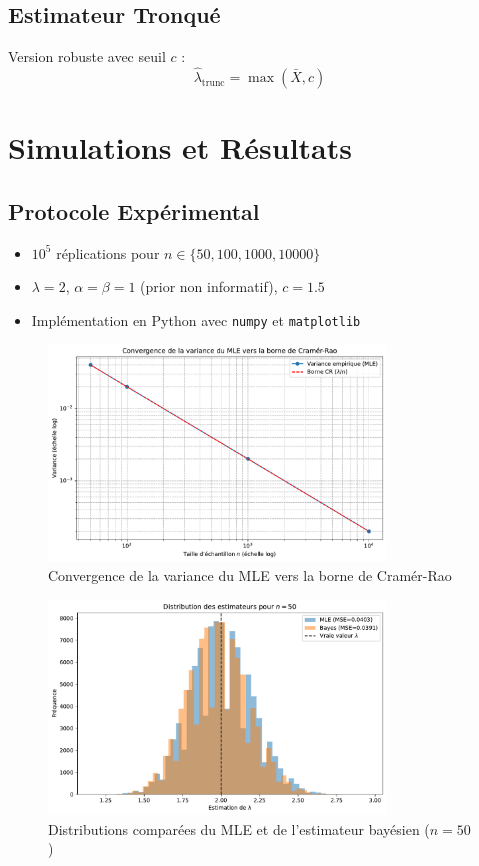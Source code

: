 \documentclass[12pt]{article}
\begin{document}
	\subsection{Estimateur Tronqué}
	Version robuste avec seuil $c$ :
	\[ \hat{\lambda}_{\text{trunc}} = \max(\bar{X}, c) \]
	
	\section{Simulations et Résultats}
	\subsection{Protocole Expérimental}
	\begin{itemize}
		\item $10^5$ réplications pour $n \in \{50,100,1000,10000\}$
		\item $\lambda = 2$, $\alpha = \beta = 1$ (prior non informatif), $c = 1.5$
		\item Implémentation en Python avec \texttt{numpy} et \texttt{matplotlib}
	\end{itemize}
	
	\begin{figure}[h!]
		\centering
		\includegraphics[width=0.8\textwidth]{figure/convergence_mle.pdf}
		\caption{Convergence de la variance du MLE vers la borne de Cramér-Rao}
		\label{fig:mle}
	\end{figure}
	
	\begin{figure}[h!]
		\centering
		\includegraphics[width=0.8\textwidth]{figure/mse_comparison.pdf}
		\caption{Distributions comparées du MLE et de l'estimateur bayésien ($n=50$)}
		\label{fig:bayes}
	\end{figure}
	
\end{document}
